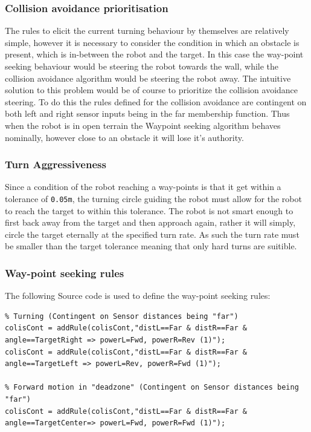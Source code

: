 \documentclass[11pt]{article}
\numberwithin{equation}{section}
\begin{document}
\subsubsection{Collision avoidance prioritisation}
\label{sec:org171ce9a}
The rules to elicit the current turning behaviour by themselves are relatively simple, however it is necessary to consider the condition in which an obstacle is present, which is in-between the robot and the target. In this case the way-point seeking behaviour would be steering the robot towards the wall, while the collision avoidance algorithm would be steering the robot away. The intuitive solution to this problem would be of course to prioritize the collision avoidance steering. To do this the rules defined for the collision avoidance are contingent on both left and right sensor inputs being in the far membership function. Thus when the robot is in open terrain the Waypoint seeking algorithm behaves nominally, however close to an obstacle it will lose it's authority.
\subsubsection{Turn Aggressiveness \label{sectWaypointSeekTurnAgressiveness}}
\label{sec:orgd82fe20}
Since a condition of the robot reaching a way-points is that it get within a tolerance of \texttt{0.05m}, the turning circle guiding the robot must allow for the robot to reach the target to within this tolerance. The robot is not smart enough to first back away from the target and then approach again, rather it will simply, circle the target eternally at the specified turn rate. As such the turn rate must be smaller than the target tolerance meaning that only hard turns are suitible.

\subsubsection{Way-point seeking rules}
\label{sec:org3cb8083}
The following Source code is used to define the way-point seeking rules:

\begin{verbatim}
% Turning (Contingent on Sensor distances being "far")
colisCont = addRule(colisCont,"distL==Far & distR==Far & angle==TargetRight => powerL=Fwd, powerR=Rev (1)");
colisCont = addRule(colisCont,"distL==Far & distR==Far & angle==TargetLeft => powerL=Rev, powerR=Fwd (1)");

% Forward motion in "deadzone" (Contingent on Sensor distances being "far")
colisCont = addRule(colisCont,"distL==Far & distR==Far & angle==TargetCenter=> powerL=Fwd, powerR=Fwd (1)");
\end{verbatim}
\end{document}
